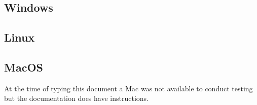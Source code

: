 \subsection{Windows}






\subsection{Linux}



\subsection{MacOS}
At the time of typing this document a Mac was not available to conduct testing
but the documentation\cite{MacVirtualBoxInstall} does have instructions.

\clearpage

